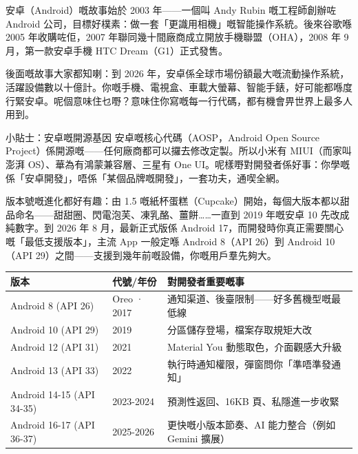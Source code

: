 


安卓（Android）嘅故事始於 2003 年——一個叫 Andy Rubin 嘅工程師創辦咗 Android 公司，目標好樸素：做一套「更識用相機」嘅智能操作系統。後來谷歌喺 2005 年收購咗佢，2007 年聯同幾十間廠商成立開放手機聯盟（OHA），2008 年 9 月，第一款安卓手機 HTC Dream（G1）正式發售。

後面嘅故事大家都知喇：到 2026 年，安卓係全球市場份額最大嘅流動操作系統，活躍設備數以十億計。你嘅手機、電視盒、車載大螢幕、智能手錶，好可能都喺度行緊安卓。呢個意味住乜嘢？意味住你寫嘅每一行代碼，都有機會畀世界上最多人用到。

\begin{tcbinfo}{小貼士：安卓嘅開源基因}
安卓嘅核心代碼（AOSP，Android Open Source Project）係開源嘅——任何廠商都可以攞去修改定製。所以小米有 MIUI（而家叫澎湃 OS）、華為有鴻蒙兼容層、三星有 One UI。呢樣嘢對開發者係好事：你學嘅係「安卓開發」，唔係「某個品牌嘅開發」，一套功夫，通喫全網。

\end{tcbinfo}

版本號嘅進化都好有趣：由 1.5 嘅紙杯蛋糕（Cupcake）開始，每個大版本都以甜品命名——甜甜圈、閃電泡芙、凍乳酪、薑餅……一直到 2019 年嘅安卓 10 先改成純數字。到 2026 年 8 月，最新正式版係 Android 17，而開發時你真正需要關心嘅「最低支援版本」，主流 App 一般定喺 Android 8（API 26）到 Android 10（API 29）之間——支援到幾年前嘅設備，你嘅用戶羣先夠大。

\begin{center}
\begin{tabularx}{\linewidth}{|X|X|X|}
\hline
\textbf{版本} & \textbf{代號/年份} & \textbf{對開發者重要嘅事} \tabularnewline
\hline
Android 8 (API 26) & Oreo · 2017 & 通知渠道、後臺限制——好多舊機型嘅最低線 \tabularnewline
Android 10 (API 29) & 2019 & 分區儲存登場，檔案存取規矩大改 \tabularnewline
Android 12 (API 31) & 2021 & Material You 動態取色，介面觀感大升級 \tabularnewline
Android 13 (API 33) & 2022 & 執行時通知權限，彈窗問你「準唔準發通知」 \tabularnewline
Android 14-15 (API 34-35) & 2023-2024 & 預測性返回、16KB 頁、私隱進一步收緊 \tabularnewline
Android 16-17 (API 36-37) & 2025-2026 & 更快嘅小版本節奏、AI 能力整合（例如 Gemini 擴展） \tabularnewline
\hline
\end{tabularx}
\end{center}

